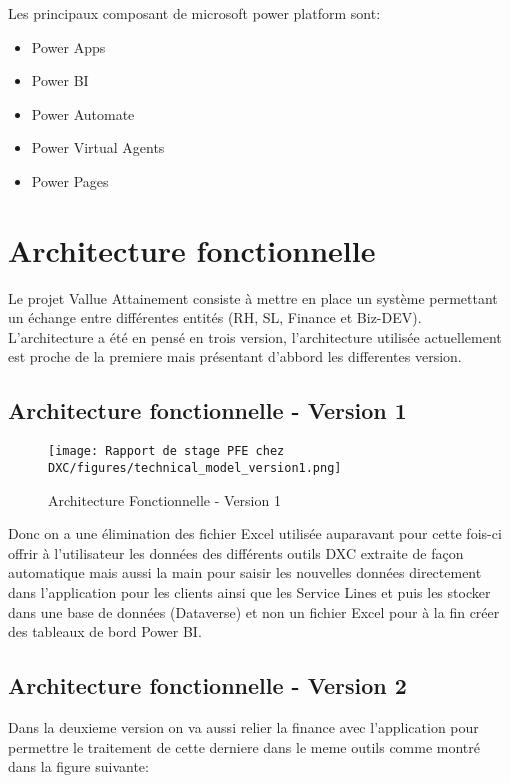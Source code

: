 Les principaux composant de microsoft power platform sont:
\\

\begin{itemize}
  \item Power Apps 
  \item Power BI 
  \item Power Automate
  \item Power Virtual Agents
  \item Power Pages
\end{itemize}




\section{Architecture fonctionnelle}

Le projet Vallue Attainement consiste à mettre en place un système permettant un
échange entre différentes entités (RH, SL, Finance et Biz-DEV).
\\

L'architecture a été en pensé en trois version, l'architecture utilisée actuellement est proche de la premiere mais présentant d'abbord les differentes version.

\subsection{Architecture fonctionnelle - Version 1}

\begin{figure}[!h]
    \centering
    \texttt{[image: Rapport de stage PFE chez DXC/figures/technical\_model\_version1.png]}
    \caption{Architecture Fonctionnelle - Version 1}
\end{figure}

Donc on a une élimination des fichier Excel utilisée auparavant pour cette fois-ci offrir à l'utilisateur les données des différents outils DXC extraite de façon automatique mais aussi la main pour saisir les nouvelles données directement dans l'application pour les clients ainsi que les Service Lines et puis les stocker dans une base de données (Dataverse) et non un fichier Excel pour à la fin créer des tableaux de bord Power BI.


\newpage
\subsection{Architecture fonctionnelle - Version 2}
Dans la deuxieme version on va aussi relier la finance avec l'application pour permettre le traitement de cette derniere dans le meme outils comme montré dans la figure suivante:

